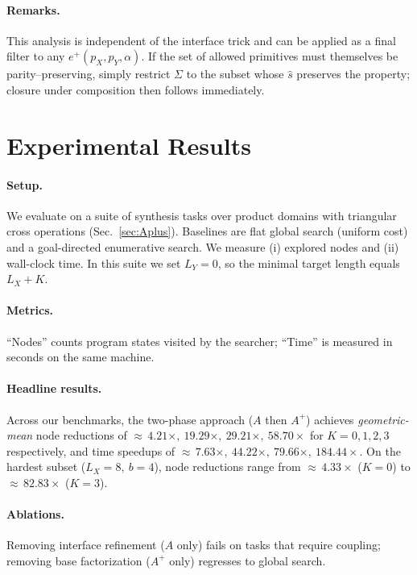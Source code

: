 \documentclass[11pt]{article}
\begin{document}
\paragraph{Remarks.} This analysis is independent of the interface trick and can be applied as a final filter to any $e^{+}(p_X,p_Y,\alpha)$. If the set of allowed primitives must themselves be parity--preserving, simply restrict $\Sigma$ to the subset whose $\widehat{s}$ preserves the property; closure under composition then follows immediately.




\section{Experimental Results}\label{sec:experiments}
\paragraph{Setup.}
We evaluate on a suite of synthesis tasks over product domains with triangular cross operations (Sec.~\ref{sec:Aplus}).
Baselines are flat global search (uniform cost) and a goal-directed enumerative search.
We measure (i) explored nodes and (ii) wall-clock time. In this suite we set $L_Y{=}0$, so the minimal target length equals $L_X{+}K$.

\paragraph{Metrics.}
``Nodes'' counts program states visited by the searcher; ``Time'' is measured in seconds on the same machine.

\paragraph{Headline results.}
Across our benchmarks, the two-phase approach (\(A\) then \(A^{+}\)) achieves \emph{geometric-mean} node reductions of $\approx\,4.21\times,\ 19.29\times,\ 29.21\times,\ 58.70\times$ for $K=0,1,2,3$ respectively, and time speedups of $\approx\,7.63\times,\ 44.22\times,\ 79.66\times,\ 184.44\times$. On the hardest subset ($L_X{=}8,\ b{=}4$), node reductions range from $\approx\,4.33\times$ ($K{=}0$) to $\approx\,82.83\times$ ($K{=}3$).

\paragraph{Ablations.}
Removing interface refinement (\(A\) only) fails on tasks that require coupling; removing base factorization (\(A^{+}\) only) regresses to global search.
\end{document}
